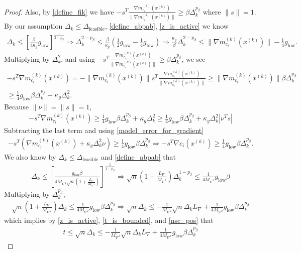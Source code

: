\documentclass{article}
\theoremstyle{case}
\numberwithin{theorem}{subsection}
\newcommand{\dfeas}{{\Delta_{\textrm{feasible}}}}
\newcommand{\dk}{\Delta_k}
\newcommand{\gmcik}{{\nabla m_{c_i}^{(k)}\left(\xk\right)}}
\newcommand{\hgik}{{\frac{\nabla m^{(k)}_{c_i}(\xk)}{\|\nabla m^{(k)}_{c_i}(\xk)\|}}}
\newcommand{\lipgrad}{{L_{\nabla}}}
\newcommand{\maxhessian}{{M_{\nabla^2}}}
\newcommand{\mingrad}{{ g_{\textrm{low}} }}
\newcommand{\xk}{{x^{(k)}}}
\begin{document}
\begin{proof}
Also, by \cref{define_fik} we have $-s^T \hgik \ge \beta \dk^{p_{\beta}}$ where $\|s\| = 1$.
By our assumption $\dk \le \dfeas$, \cref{define_abpab}, \cref{z_is_active} we know
\begin{align*}
\dk \le \left[\frac{\beta}{4\kappa_g}\mingrad \right]^{\frac 1 {2 - p_{\beta}}}
\Longrightarrow \dk^{2 - p_{\beta}} \le \frac{\beta}{\kappa_g}\left(\frac 1 2\mingrad  - \frac 1 4 \mingrad \right)
\Longrightarrow \frac{\kappa_g}{\beta} \dk^{2 - p_{\beta}} \le \|\gmcik\| - \frac 1 4 \mingrad.
\end{align*}
Multiplying by $\dk^2$, and using $-s^T \hgik \ge \beta \dk^{p_{\beta}}$, we see
\begin{align*}
-s^T\gmcik =  -\|\gmcik\|s^T\hgik \ge \|\gmcik\|\beta\dk^{p_{\beta}} \\
\ge \frac 1 4 \mingrad  \beta \dk^{p_{\beta}} + \kappa_g\dk^2.
\end{align*}
Because $\|\nu\| = \|s\| = 1$,
\begin{align*}
-s^T\gmcik \ge \frac 1 4 \mingrad  \beta \dk^{p_{\beta}} + \kappa_g\dk^2 \ge \frac 1 4 \mingrad  \beta \dk^{p_{\beta}} + \kappa_g\dk^2|\nu^T s|
\end{align*}
Subtracting the last term and using \cref{model_error_for_gradient}
\begin{align}
-s^T\left(\gmcik + \kappa_g\dk^2\nu\right) \ge \frac 1 4 \mingrad  \beta \dk ^{p_{\beta}}
\Longrightarrow -s^T\nabla c_i(\xk) \ge \frac 1 4 \mingrad  \beta \dk^{p_{\beta}}. \label{nsc_pos}
\end{align}
We also know by $\dk \le \dfeas$ and \cref{define_abpab} that
\begin{align*}
\dk \le \left[\frac {\mingrad  \beta} {4\maxhessian\sqrt{n}\left(1 + \frac {\lipgrad} \maxhessian \right)}\right]^{\frac1 {1 - p_{\beta}} }
\Longrightarrow \sqrt{n}\left(1 + \frac {\lipgrad} \maxhessian \right) \dk^{1-p_{\beta}}\le \frac 1 {4\maxhessian} \mingrad  \beta
\end{align*}
Multiplying by $\dk^{p_{\beta}}$,
\begin{align*}
\sqrt{n}\left(1 + \frac {\lipgrad} \maxhessian \right) \dk \le \frac 1 {4\maxhessian} \mingrad  \beta \dk^{p_{\beta}}
\Longrightarrow \sqrt{n} \dk \le -\frac 1 \maxhessian \sqrt{n}\dk \lipgrad + \frac 1 {4\maxhessian} \mingrad  \beta \dk^{p_{\beta}}
\end{align*}
which implies by \cref{z_is_active}, \cref{t_is_bounded}, and \cref{nsc_pos} that
\begin{align*}
t 
\le \sqrt{n} \dk 
\le -\frac 1 \maxhessian \sqrt{n}\dk \lipgrad + \frac 1 {4\maxhessian} \mingrad \beta \dk^{p_{\beta}}

\end{align*}
\end{proof}
\end{document}
